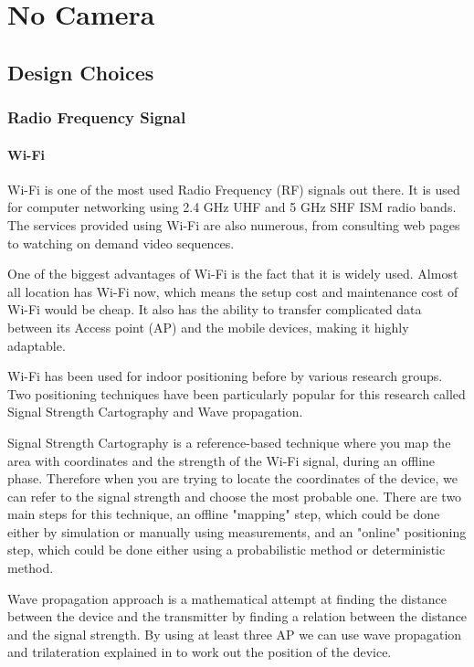 \chapter{No Camera}

\label{ch:no_camera}

\section{Design Choices}

\subsection{Radio Frequency Signal}

\subsubsection{Wi-Fi}

Wi-Fi is one of the most used Radio Frequency (RF) signals out there.
It is used for computer networking using 2.4 GHz UHF and 5 GHz SHF
ISM radio bands\cite{wifi-wikipedia}. The services provided using Wi-Fi are also
numerous, from consulting web pages to watching on demand video sequences. 

One of the biggest advantages of Wi-Fi is the fact that it is
widely used. Almost all location has Wi-Fi now, which means the setup
cost and maintenance cost of Wi-Fi would be cheap. It also has the
ability to transfer complicated data between its Access point (AP)
and the mobile devices, making it highly adaptable. 

Wi-Fi has been used for indoor positioning before by various research
groups\cite{wifi-indoor}. Two positioning techniques have been particularly popular for this research
called Signal Strength Cartography and Wave propagation. 

Signal Strength Cartography\cite{sig-cart} is a reference-based technique where you map the area
with coordinates and the strength of the Wi-Fi signal, during an offline phase. Therefore when you
are trying to locate the coordinates of the device, we can refer to the signal strength and choose the most probable one. There are two main steps
for this technique, an offline "mapping" step, which could be done either
by simulation or manually using measurements, and an "online" positioning
step, which could be done either using a probabilistic method or deterministic
method. 

Wave propagation approach is a mathematical attempt at finding the
distance between the device and the transmitter by finding a relation
between the distance and the signal strength. By using at least three
AP we can use wave propagation and trilateration explained in  to work out the position
of the device. 

